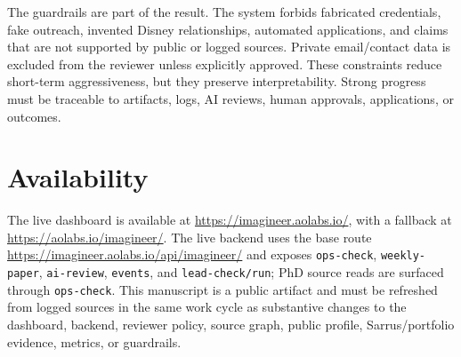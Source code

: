\documentclass[12pt,letterpaper]{article}
\begin{document}
The guardrails are part of the result. The system forbids fabricated credentials, fake outreach, invented Disney relationships, automated applications, and claims that are not supported by public or logged sources. Private email/contact data is excluded from the reviewer unless explicitly approved. These constraints reduce short-term aggressiveness, but they preserve interpretability. Strong progress must be traceable to artifacts, logs, AI reviews, human approvals, applications, or outcomes.

\section{Availability}

The live dashboard is available at \url{https://imagineer.aolabs.io/}, with a fallback at \url{https://aolabs.io/imagineer/}. The live backend uses the base route \url{https://imagineer.aolabs.io/api/imagineer/} and exposes \texttt{ops-check}, \texttt{weekly-paper}, \texttt{ai-review}, \texttt{events}, and \texttt{lead-check/run}; PhD source reads are surfaced through \texttt{ops-check}. This manuscript is a public artifact and must be refreshed from logged sources in the same work cycle as substantive changes to the dashboard, backend, reviewer policy, source graph, public profile, Sarrus/portfolio evidence, metrics, or guardrails.

\printbibliography
\end{document}
